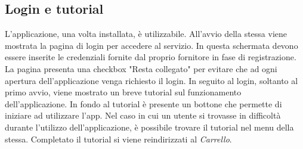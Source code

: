 \documentclass[12pt, a4paper, titlepage]{report}
\begin{document}
	\subsection{Login e tutorial}
	
	L'applicazione, una volta installata, è utilizzabile. All'avvio della stessa viene mostrata la pagina di login per accedere al servizio. In questa schermata devono essere inserite le credenziali fornite dal proprio fornitore in fase di registrazione. La pagina presenta una checkbox "Resta collegato" per evitare che ad ogni apertura dell'applicazione venga richiesto il login. In seguito al login, soltanto al primo avvio, viene mostrato un breve tutorial sul funzionamento dell'applicazione. In fondo al tutorial è presente un bottone che permette di iniziare ad utilizzare l'app. Nel caso in cui un utente si trovasse in difficoltà durante l'utilizzo dell'applicazione, è possibile trovare il tutorial nel menu della stessa. Completato il tutorial si viene reindirizzati al \textit{Carrello}.
	
\end{document}
